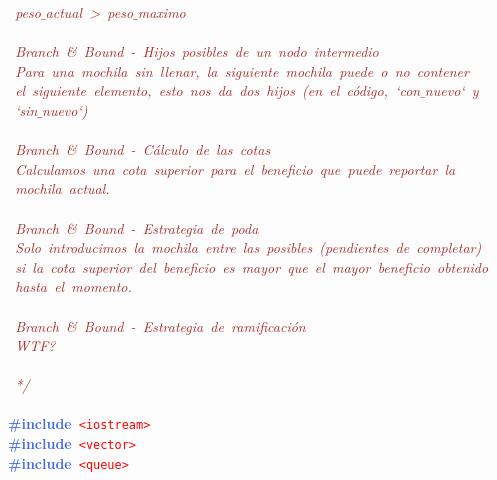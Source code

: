 \mbox{}\textit{\textcolor{Brown}{\ peso$\_$actual\ \textgreater{}\ peso$\_$maximo}} \\
\mbox{} \\
\mbox{}\textit{\textcolor{Brown}{\ Branch\ \&\ Bound\ -\ Hijos\ posibles\ de\ un\ nodo\ intermedio}} \\
\mbox{}\textit{\textcolor{Brown}{\ Para\ una\ mochila\ sin\ llenar,\ la\ siguiente\ mochila\ puede\ o\ no\ contener}} \\
\mbox{}\textit{\textcolor{Brown}{\ el\ siguiente\ elemento,\ esto\ nos\ da\ dos\ hijos\ (en\ el\ código,\ `con$\_$nuevo`\ y}} \\
\mbox{}\textit{\textcolor{Brown}{\ `sin$\_$nuevo`)}} \\
\mbox{} \\
\mbox{}\textit{\textcolor{Brown}{\ Branch\ \&\ Bound\ -\ Cálculo\ de\ las\ cotas}} \\
\mbox{}\textit{\textcolor{Brown}{\ Calculamos\ una\ cota\ superior\ para\ el\ beneficio\ que\ puede\ reportar\ la}} \\
\mbox{}\textit{\textcolor{Brown}{\ mochila\ actual.}} \\
\mbox{} \\
\mbox{}\textit{\textcolor{Brown}{\ Branch\ \&\ Bound\ -\ Estrategia\ de\ poda}} \\
\mbox{}\textit{\textcolor{Brown}{\ Solo\ introducimos\ la\ mochila\ entre\ las\ posibles\ (pendientes\ de\ completar)}} \\
\mbox{}\textit{\textcolor{Brown}{\ si\ la\ cota\ superior\ del\ beneficio\ es\ mayor\ que\ el\ mayor\ beneficio\ obtenido}} \\
\mbox{}\textit{\textcolor{Brown}{\ hasta\ el\ momento.}} \\
\mbox{} \\
\mbox{}\textit{\textcolor{Brown}{\ Branch\ \&\ Bound\ -\ Estrategia\ de\ ramificación}} \\
\mbox{}\textit{\textcolor{Brown}{\ WTF?}} \\
\mbox{} \\
\mbox{}\textit{\textcolor{Brown}{\ */}} \\
\mbox{} \\
\mbox{}\textbf{\textcolor{RoyalBlue}{\#include}}\ \texttt{\textcolor{Red}{\textless{}iostream\textgreater{}}} \\
\mbox{}\textbf{\textcolor{RoyalBlue}{\#include}}\ \texttt{\textcolor{Red}{\textless{}vector\textgreater{}}} \\
\mbox{}\textbf{\textcolor{RoyalBlue}{\#include}}\ \texttt{\textcolor{Red}{\textless{}queue\textgreater{}}} \\
